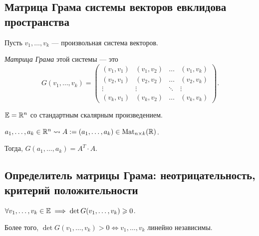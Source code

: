 \subsection{Матрица Грама системы векторов евклидова пространства}

Пусть $v_1, \dots, v_k$ --- произвольная система векторов.

\begin{definition}
    \textit{Матрица Грама} этой системы --- это
    \begin{equation*}
        G(v_1, \dots, v_k) = \begin{pmatrix}
            (v_1, v_1) & (v_1, v_2) & \dots & (v_1, v_k) \\
            (v_2, v_1) & (v_2, v_2) & \dots & (v_2, v_k) \\
            \vdots & \vdots & \ddots & \vdots \\
            (v_k, v_1) & (v_k, v_2) & \dots & (v_k, v_k)
        \end{pmatrix}
    .\end{equation*}
\end{definition}

\begin{example}
    $\mathbb{E} = \mathbb{R}^n$ со стандартным скалярным произведением.

    $a_1, \dots, a_k \in \mathbb{R}^n \leadsto A := (a_1, \dots, a_k) \in \text{Mat}_{n \times k}(\mathbb{R})$.

    Тогда, $G(a_1, \dots, a_k) = A^T \cdot A$.
\end{example}


\subsection{Определитель матрицы Грама: неотрицательность, критерий положительности}

\begin{proposal}
    $\forall v_1, \dots, v_k \in \mathbb{E} \implies \det G(v_1, \dots, v_k) \geqslant 0$.

    Более того, $\det G(v_1, \dots, v_k) > 0 \iff v_1, \dots, v_k$ линейно независимы. 
\end{proposal}

